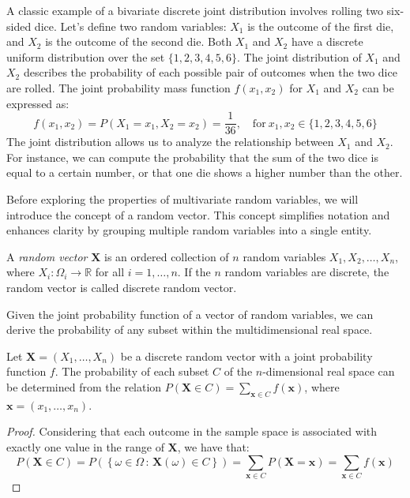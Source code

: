 \begin{example}
A classic example of a bivariate discrete joint distribution involves rolling two six-sided dice. Let's define two random variables: $X_1$ is the outcome of the first die, and $X_2$ is the outcome of the second die. Both $X_1$ and $X_2$ have a discrete uniform distribution over the set $\{1, 2, 3, 4, 5, 6\}$. The joint distribution of $X_1$ and $X_2$ describes the probability of each possible pair of outcomes when the two dice are rolled. The joint probability mass function $f(x_1, x_2)$ for $X_1$ and $X_2$ can be expressed as:
\[
f(x_1, x_2) = P(X_1 = x_1, X_2 = x_2) = \frac{1}{36}, \quad \text{for} \ x_1, x_2 \in \{1, 2, 3, 4, 5, 6\}
\]
The joint distribution allows us to analyze the relationship between $X_1$ and $X_2$. For instance, we can compute the probability that the sum of the two dice is equal to a certain number, or that one die shows a higher number than the other.
\end{example}

Before exploring the properties of multivariate random variables, we will introduce the concept of a random vector. This concept simplifies notation and enhances clarity by grouping multiple random variables into a single entity.

\begin{definition}
A \emph{random vector} $\mathbf{X}$ is an ordered collection of $n$ random variables $X_1, X_2, \ldots, X_n$, where $X_i : \Omega_i \rightarrow \mathbb{R}$ for all $i=1, \ldots, n$. If the $n$ random variables are discrete, the random vector is called discrete random vector.
\end{definition}

Given the joint probability function of a vector of random variables, we can derive the probability of any subset within the multidimensional real space.

\begin{proposition}
Let $\mathbf{X}=\left(X_{1}, \ldots, X_{n}\right)$ be a discrete random vector with a joint probability function $f$. The probability of each subset $C$ of the $n$-dimensional real space can be determined from the relation $P\left(\mathbf{X} \in C\right)=\sum_{\mathbf{x} \in C}f\left(\mathbf{x}\right)$, where $\mathbf{x} = (x_{1}, \ldots, x_{n})$.
\end{proposition}
\begin{proof}
Considering that each outcome in the sample space is associated with exactly one value in the range of $\mathbf{X}$, we have that:
\[
P\left(\mathbf{X} \in C\right) = P \left( \left\{ \omega \in \Omega \,:\, \mathbf{X}(\omega) \in C\right\} \right) = \sum_{\mathbf{x}\in C} P\left( \mathbf{X} = \mathbf{x} \right) = \sum_{\mathbf{x}\in C}f\left(\mathbf{x}\right)
\]
\end{proof}

